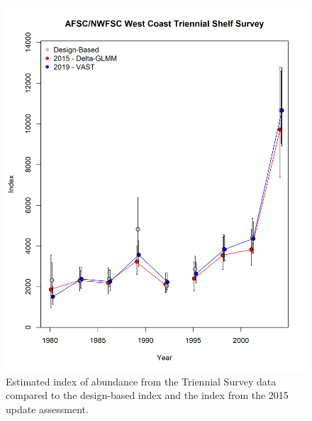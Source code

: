 \documentclass[12pt,]{article}
\begin{document}
\begin{figure}
\centering
\includegraphics{Figures/Triennial_Index_w_VAST.png}
\caption{Estimated index of abundance from the Triennial Survey data
compared to the design-based index and the index from the 2015 update
assessment. \label{fig:tri_index}}
\end{figure}

\FloatBarrier
\end{document}
